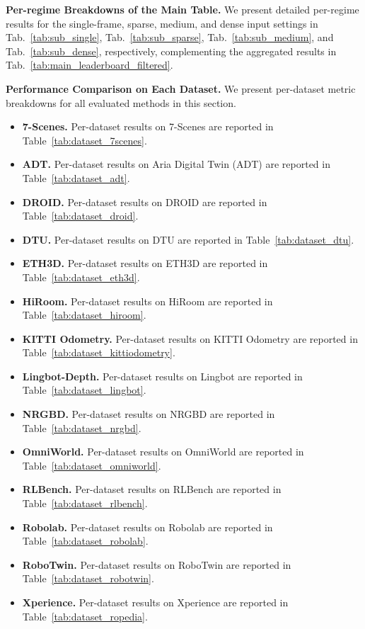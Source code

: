 \documentclass{llmxive}
\begin{document}
\textbf{Per-regime Breakdowns of the Main Table.} We present detailed per-regime results for the single-frame, sparse, medium, and dense input settings in Tab.~\ref{tab:sub_single}, Tab.~\ref{tab:sub_sparse}, Tab.~\ref{tab:sub_medium}, and Tab.~\ref{tab:sub_dense}, respectively, complementing the aggregated results in Tab.~\ref{tab:main_leaderboard_filtered}.

\noindent\textbf{Performance Comparison on Each Dataset.}
We present per-dataset metric breakdowns for all evaluated methods in this section.

\begin{itemize}
  \item \textbf{7-Scenes.} Per-dataset results on 7-Scenes are reported in Table~\ref{tab:dataset_7scenes}.
  \item \textbf{ADT.} Per-dataset results on Aria Digital Twin (ADT) are reported in Table~\ref{tab:dataset_adt}.
  \item \textbf{DROID.} Per-dataset results on DROID are reported in Table~\ref{tab:dataset_droid}.
  \item \textbf{DTU.} Per-dataset results on DTU are reported in Table~\ref{tab:dataset_dtu}.
  \item \textbf{ETH3D.} Per-dataset results on ETH3D are reported in Table~\ref{tab:dataset_eth3d}.
  \item \textbf{HiRoom.} Per-dataset results on HiRoom are reported in Table~\ref{tab:dataset_hiroom}.
  \item \textbf{KITTI Odometry.} Per-dataset results on KITTI Odometry are reported in Table~\ref{tab:dataset_kittiodometry}.
  \item \textbf{Lingbot-Depth.} Per-dataset results on Lingbot are reported in Table~\ref{tab:dataset_lingbot}.
  \item \textbf{NRGBD.} Per-dataset results on NRGBD are reported in Table~\ref{tab:dataset_nrgbd}.
  \item \textbf{OmniWorld.} Per-dataset results on OmniWorld are reported in Table~\ref{tab:dataset_omniworld}.
  \item \textbf{RLBench.} Per-dataset results on RLBench are reported in Table~\ref{tab:dataset_rlbench}.
  \item \textbf{Robolab.} Per-dataset results on Robolab are reported in Table~\ref{tab:dataset_robolab}.
  \item \textbf{RoboTwin.} Per-dataset results on RoboTwin are reported in Table~\ref{tab:dataset_robotwin}.
  \item \textbf{Xperience.} Per-dataset results on Xperience are reported in Table~\ref{tab:dataset_ropedia}.

\end{itemize}
\end{document}
